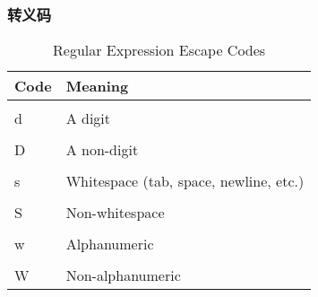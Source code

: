 \subsubsection{转义码}
\begin{table}
    \centering
    \caption{Regular Expression Escape Codes}
    \label{tbl1-1}
    \begin{tabular}{ll}
        \hline
        Code & Meaning \\
        \hline
        \\d   & A digit                                \\
        \\D   & A non-digit                            \\
        \\s   & Whitespace (tab, space, newline, etc.) \\
        \\S   & Non-whitespace                         \\
        \\w   & Alphanumeric                           \\
        \\W   & Non-alphanumeric                       \\
        \hline
    \end{tabular}

\end{table}